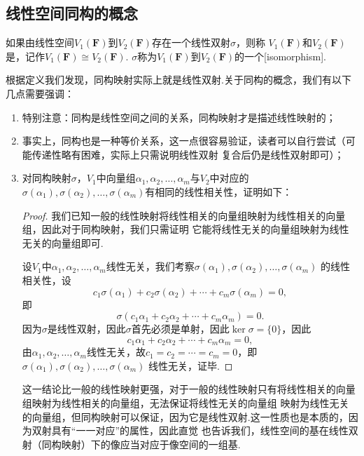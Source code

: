 \subsection{线性空间同构的概念}
\begin{definition}
    如果由线性空间$V_1(\mathbf{F})$到$V_2(\mathbf{F})$存在一个线性双射$\sigma$，则称
    $V_1(\mathbf{F})$和$V_2(\mathbf{F})$是，记作$V_1(\mathbf{F}) \cong V_2(\mathbf{F})$.
    $\sigma$称为$V_1(\mathbf{F})$到$V_2(\mathbf{F})$的一个[isomorphism].
\end{definition}

根据定义我们发现，同构映射实际上就是线性双射.关于同构的概念，我们有以下几点需要强调：
\begin{enumerate}
    \item 特别注意：同构是线性空间之间的关系，同构映射才是描述线性映射的；
    \item 事实上，同构也是一种等价关系，这一点很容易验证，读者可以自行尝试（可能传递性略有困难，实际上只需说明线性双射
    复合后仍是线性双射即可）；
    \item 对同构映射$\sigma$，$V_1$中向量组$ \alpha_1,\alpha_2,\ldots,\alpha_m $与$V_2$中对应的
    $ \sigma(\alpha_1),\sigma(\alpha_2),\ldots,\sigma(\alpha_m) $有相同的线性相关性，证明如下：

    \begin{proof}
        我们已知一般的线性映射将线性相关的向量组映射为线性相关的向量组，因此对于同构映射，我们只需证明
        它能将线性无关的向量组映射为线性无关的向量组即可.
        
        设$V_1$中$\alpha_1,\alpha_2,\ldots,\alpha_m$线性无关，我们考察$\sigma(\alpha_1),\sigma(\alpha_2),\ldots,\sigma(\alpha_m)$
        的线性相关性，设
        \[c_1\sigma(\alpha_1)+c_2\sigma(\alpha_2)+\cdots+c_m\sigma(\alpha_m)=0,\]
        即
        \[\sigma(c_1\alpha_1+c_2\alpha_2+\cdots+c_m\alpha_m)=0.\]
        因为$\sigma$是线性双射，因此$\sigma$首先必须是单射，因此$\ker\sigma=\{0\}$，因此
        \[c_1\alpha_1+c_2\alpha_2+\cdots+c_m\alpha_m=0,\]
        由$\alpha_1,\alpha_2,\ldots,\alpha_m$线性无关，故$c_1=c_2=\cdots=c_m=0$，即$\sigma(\alpha_1),\sigma(\alpha_2),\ldots,\sigma(\alpha_m)$
        线性无关，证毕.
    \end{proof}
    
    这一结论比一般的线性映射更强，对于一般的线性映射只有将线性相关的向量组映射为线性相关的向量组，无法保证将线性无关的向量组
    映射为线性无关的向量组，但同构映射可以保证，因为它是线性双射.这一性质也是本质的，因为双射具有``一一对应''的属性，因此直觉
    也告诉我们，线性空间的基在线性双射（同构映射）下的像应当对应于像空间的一组基.
\end{enumerate}

